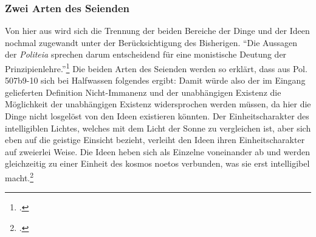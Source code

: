 \subsubsection{Zwei Arten des Seienden}
Von hier aus wird sich die Trennung der beiden Bereiche der Dinge und der Ideen nochmal zugewandt unter der Berücksichtigung des Bisherigen.
\enquote{Die Aussagen der \emph{Politeia} sprechen darum entscheidend für eine monistische Deutung der Prinzipienlehre.}\footcite[][S. 137]{halfwassen2015spuren}
Die beiden Arten des Seienden werden so erklärt, dass  
aus Pol. 507b9-10 sich bei Halfwassen folgendes ergibt:
Damit würde also der im Eingang gelieferten Definition Nicht-Immanenz und der unabhängigen Existenz die Möglichkeit der unabhängigen Existenz widersprochen werden müssen, da hier die Dinge nicht losgelöst von den Ideen existieren könnten.
Der Einheitscharakter des intelligiblen Lichtes, welches mit dem Licht der Sonne zu vergleichen ist, aber sich eben auf die geistige Einsicht bezieht, verleiht den Ideen ihren Einheitscharakter auf zweierlei Weise. Die Ideen heben sich als Einzelne voneinander ab und werden gleichzeitig zu einer Einheit des kosmos noetos verbunden, was sie erst intelligibel macht.\footcite[vgl.][S. 252]{halfwassenaufstieg2006} 
